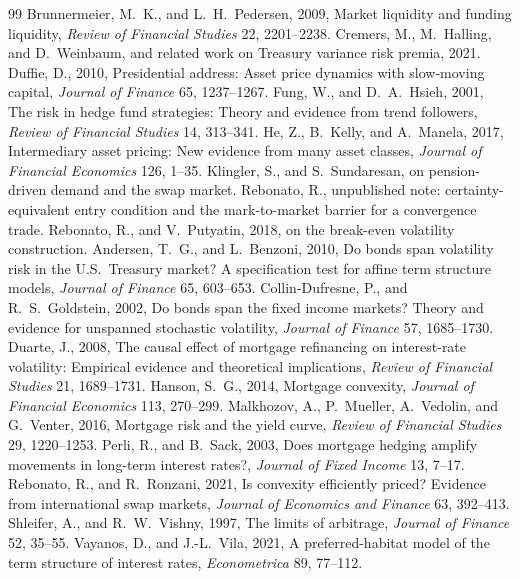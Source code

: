 \documentclass[11pt]{article}
\begin{document}
\begin{thebibliography}{99}
 Brunnermeier, M.\ K., and L.\ H.\ Pedersen, 2009,
Market liquidity and funding liquidity, \emph{Review of Financial Studies} 22, 2201--2238.
 Cremers, M., M.\ Halling, and D.\ Weinbaum, and related work on
Treasury variance risk premia, 2021.
 Duffie, D., 2010, Presidential address: Asset price dynamics with
slow-moving capital, \emph{Journal of Finance} 65, 1237--1267.
 Fung, W., and D.\ A.\ Hsieh, 2001, The risk in hedge fund
strategies: Theory and evidence from trend followers, \emph{Review of Financial Studies} 14, 313--341.
 He, Z., B.\ Kelly, and A.\ Manela, 2017, Intermediary asset pricing:
New evidence from many asset classes, \emph{Journal of Financial Economics} 126, 1--35.
 Klingler, S., and S.\ Sundaresan, on pension-driven
demand and the swap market.
 Rebonato, R., unpublished note: certainty-equivalent
entry condition and the mark-to-market barrier for a convergence trade.
 Rebonato, R., and V.\ Putyatin, 2018, on the break-even
volatility construction.
 Andersen, T.\ G., and L.\ Benzoni, 2010, Do bonds span volatility risk in the U.S.\ Treasury market? A specification test for affine term structure models, \emph{Journal of Finance} 65, 603--653.
 Collin-Dufresne, P., and R.\ S.\ Goldstein, 2002, Do bonds span the fixed income markets? Theory and evidence for unspanned stochastic volatility, \emph{Journal of Finance} 57, 1685--1730.
 Duarte, J., 2008, The causal effect of mortgage refinancing on interest-rate volatility: Empirical evidence and theoretical implications, \emph{Review of Financial Studies} 21, 1689--1731.
 Hanson, S.\ G., 2014, Mortgage convexity, \emph{Journal of Financial Economics} 113, 270--299.
 Malkhozov, A., P.\ Mueller, A.\ Vedolin, and G.\ Venter, 2016, Mortgage risk and the yield curve, \emph{Review of Financial Studies} 29, 1220--1253.
 Perli, R., and B.\ Sack, 2003, Does mortgage hedging amplify movements in long-term interest rates?, \emph{Journal of Fixed Income} 13, 7--17.
 Rebonato, R., and R.\ Ronzani, 2021, Is convexity
efficiently priced? Evidence from international swap markets, \emph{Journal of Economics and Finance}
63, 392--413.
 Shleifer, A., and R.\ W.\ Vishny, 1997, The limits of
arbitrage, \emph{Journal of Finance} 52, 35--55.
 Vayanos, D., and J.-L.\ Vila, 2021, A preferred-habitat model
of the term structure of interest rates, \emph{Econometrica} 89, 77--112.
\end{thebibliography}
\end{document}
